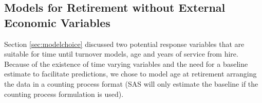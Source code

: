 \documentclass[12pt,letterpaper]{article}
\begin{document}
\subsection{Models for Retirement without External Economic Variables}
Section \ref{sec:modelchoice} discussed two potential response variables that are suitable for time until turnover models, age and years of service from hire.  Because of the existence of time varying variables and the need for a baseline estimate to facilitate predictions, we chose to model age at retirement arranging the data in a counting process format (SAS will only estimate the baseline if the counting process formulation is used).



\end{document}
